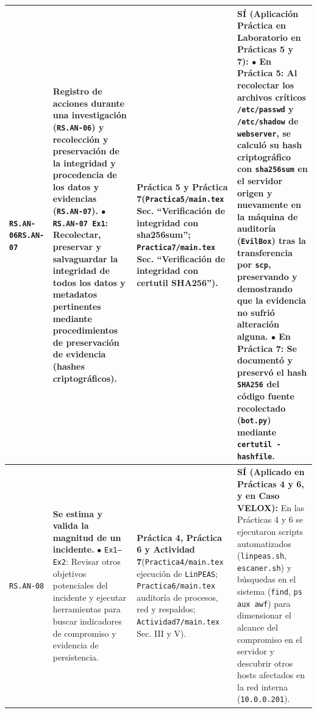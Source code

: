 \documentclass[letterpaper,11pt]{article}
\begin{document}
\begin{longtable}{|C{1.5cm}|L{5.3cm}|L{4.3cm}|L{5.8cm}|}
\texttt{RS.AN-06}\newline \texttt{RS.AN-07} &
\textbf{Registro de acciones durante una investigación (\texttt{RS.AN-06}) y recolección y preservación de la integridad y procedencia de los datos y evidencias (\texttt{RS.AN-07}).}\newline
$\bullet$ \texttt{RS.AN-07 Ex1}: \textbf{Recolectar, preservar y salvaguardar la integridad de todos los datos y metadatos pertinentes mediante procedimientos de preservación de evidencia (hashes criptográficos)}. &
\textbf{Práctica 5 y Práctica 7}\newline (\texttt{Practica5/main.tex} Sec. ``Verificación de integridad con sha256sum''; \texttt{Practica7/main.tex} Sec. ``Verificación de integridad con certutil SHA256''). &
\textbf{SÍ (Aplicación Práctica en Laboratorio en Prácticas 5 y 7):}\newline
$\bullet$ \textbf{En Práctica 5:} Al recolectar los archivos críticos \texttt{/etc/passwd} y \texttt{/etc/shadow} de \texttt{webserver}, se calculó su hash criptográfico con \texttt{sha256sum} en el servidor origen y nuevamente en la máquina de auditoría (\texttt{EvilBox}) tras la transferencia por \texttt{scp}, preservando y demostrando que la evidencia no sufrió alteración alguna.\newline
$\bullet$ \textbf{En Práctica 7:} Se documentó y preservó el hash \texttt{SHA256} del código fuente recolectado (\texttt{bot.py}) mediante \texttt{certutil -hashfile}. \\
\hline

\texttt{RS.AN-08} &
\textbf{Se estima y valida la magnitud de un incidente.}\newline
$\bullet$ \texttt{Ex1--Ex2}: Revisar otros objetivos potenciales del incidente y ejecutar herramientas para buscar indicadores de compromiso y evidencia de persistencia. &
\textbf{Práctica 4, Práctica 6 y Actividad 7}\newline (\texttt{Practica4/main.tex} ejecución de \texttt{LinPEAS}; \texttt{Practica6/main.tex} auditoría de procesos, red y respaldos; \texttt{Actividad7/main.tex} Sec. III y V). &
\textbf{SÍ (Aplicado en Prácticas 4 y 6, y en Caso VELOX):}\newline
En las Prácticas 4 y 6 se ejecutaron scripts automatizados (\texttt{linpeas.sh}, \texttt{escaner.sh}) y búsquedas en el sistema (\texttt{find}, \texttt{ps aux awf}) para dimensionar el alcance del compromiso en el servidor y descubrir otros hosts afectados en la red interna (\texttt{10.0.0.201}). \\
\hline


\end{longtable}
\end{document}
